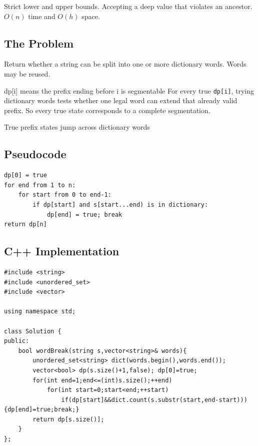   {Strict lower and upper bounds.}
  {Accepting a deep value that violates an ancestor.}{$O(n)$ time and $O(h)$ space.}



\subsection{The Problem}
Return whether a string can be split into one or more dictionary words. Words
may be reused.

\begin{invariantbox}{dp[i] means the prefix ending before i is segmentable}
For every true \texttt{dp[i]}, trying dictionary words tests whether one legal
word can extend that already valid prefix. So every true state corresponds
to a complete segmentation.
\end{invariantbox}

\begin{visualbox}{True prefix states jump across dictionary words}
\centering
{}
\end{visualbox}

\subsection{Pseudocode}
\begin{lstlisting}[style=pseudocode]
dp[0] = true
for end from 1 to n:
    for start from 0 to end-1:
        if dp[start] and s[start...end) is in dictionary:
            dp[end] = true; break
return dp[n]
\end{lstlisting}

\subsection{C++ Implementation}
\begin{lstlisting}[style=compactcode,caption={Complete C++ solution: Word Break}]
#include <string>
#include <unordered_set>
#include <vector>

using namespace std;

class Solution {
public:
    bool wordBreak(string s,vector<string>& words){
        unordered_set<string> dict(words.begin(),words.end());
        vector<bool> dp(s.size()+1,false); dp[0]=true;
        for(int end=1;end<=(int)s.size();++end)
            for(int start=0;start<end;++start)
                if(dp[start]&&dict.count(s.substr(start,end-start))){dp[end]=true;break;}
        return dp[s.size()];
    }
};
\end{lstlisting}

